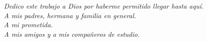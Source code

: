 \section*{}
\pagestyle{empty}
\vfill
    \begin{flushright}
        \textit{
        Dedico este trabajo a Dios por haberme permitido llegar hasta aquí.\\
        A mis padres, hermana y familia en general.\\
        A mi prometida.\\
        A mis amigos y a mis compañeros de estudio.
    }\end{flushright}
